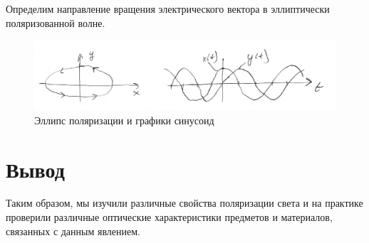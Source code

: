 \documentclass[12pt]{kiarticle}
\begin{document}
Определим направление вращения электрического вектора в эллиптически поляризованной волне.

	\begin{figure}[h!]
	\centering
	\includegraphics[width=\linewidth]{el}
	\caption{Эллипс поляризации и графики синусоид}
	\label{el}
\end{figure}

\section{Вывод}

Таким образом, мы изучили различные свойства поляризации света и на практике проверили различные оптические характеристики предметов и материалов, связанных с данным явлением. 
\end{document}
